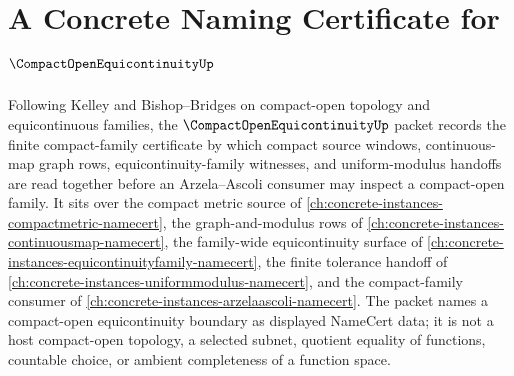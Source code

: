 \chapter{A Concrete Naming Certificate for $\CompactOpenEquicontinuityUp$}
\label{ch:concrete-instances-compact-open-equicontinuity-namecert}

Following Kelley and Bishop--Bridges on compact-open topology and equicontinuous families, the $\CompactOpenEquicontinuityUp$ packet records the finite compact-family certificate by which compact source windows, continuous-map graph rows, equicontinuity-family witnesses, and uniform-modulus handoffs are read together before an Arzela--Ascoli consumer may inspect a compact-open family. It sits over the compact metric source of \autoref{ch:concrete-instances-compactmetric-namecert}, the graph-and-modulus rows of \autoref{ch:concrete-instances-continuousmap-namecert}, the family-wide equicontinuity surface of \autoref{ch:concrete-instances-equicontinuityfamily-namecert}, the finite tolerance handoff of \autoref{ch:concrete-instances-uniformmodulus-namecert}, and the compact-family consumer of \autoref{ch:concrete-instances-arzelaascoli-namecert}. The packet names a compact-open equicontinuity boundary as displayed NameCert data; it is not a host compact-open topology, a selected subnet, quotient equality of functions, countable choice, or ambient completeness of a function space.

